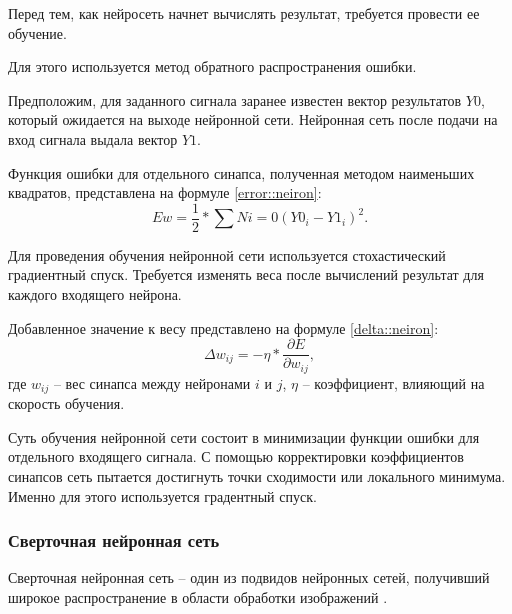 Перед тем, как нейросеть начнет вычислять результат, требуется провести ее обучение.

Для этого используется метод обратного распространения ошибки.

Предположим, для заданного сигнала заранее известен вектор результатов $Y0$, который ожидается на выходе нейронной сети.
Нейронная сеть после подачи на вход сигнала выдала вектор $Y1$.

Функция ошибки для отдельного синапса, полученная методом наименьших квадратов, представлена на формуле \ref{error::neiron}:
\begin{equation}
	\label{error::neiron}
	E{w} = \frac{1}{2} * \sum{N}{i = 0} (Y0_i - Y1_i)^2.
\end{equation}

Для проведения обучения нейронной сети используется стохастический градиентный спуск. 
Требуется изменять веса после вычислений результат для каждого входящего нейрона.

Добавленное значение к весу представлено на формуле \ref{delta::neiron}:
\begin{equation}
	\label{delta::neiron}
	\Delta w_{ij} = -\eta * \frac{\partial E}{\partial w_{ij}},
\end{equation}
где $w_{ij}$ -- вес синапса между нейронами $i$ и $j$, $\eta$ -- коэффициент, влияющий на скорость обучения.

Суть обучения нейронной сети состоит в минимизации функции ошибки для отдельного входящего сигнала.
С помощью корректировки коэффициентов синапсов сеть пытается достигнуть точки сходимости или локального минимума.
Именно для этого используется градентный спуск.

\subsubsection{Сверточная нейронная сеть}
Сверточная нейронная сеть -- один из подвидов нейронных сетей, получивший широкое распространение в области обработки изображений \cite{CNN_research}.

